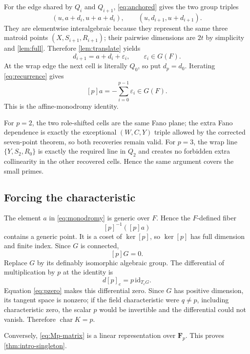 \documentclass[11pt]{article}
\theoremstyle{definition}
\begin{document}
For the edge shared by $Q_i$ and $Q_{i+1}$, \eqref{eq:anchored} gives the two group triples
\[
(u,a+d_i,u+a+d_i),\qquad
(u,d_{i+1},u+d_{i+1}).
\]
They are elementwise interalgebraic because they represent the same three matroid points $(X,S_{i+1},R_{i+1})$; their pairwise dimensions are $2t$ by simplicity and \cref{lem:full}.  Therefore \cref{lem:translate} yields
\begin{equation}\label{eq:recurrence}
d_{i+1}=a+d_i+\varepsilon_i,\qquad \varepsilon_i\in G(F).
\end{equation}
At the wrap edge the next cell is literally $Q_0$, so put $d_p=d_0$.  Iterating \eqref{eq:recurrence} gives
\begin{equation}\label{eq:monodromy}
[p]a=-\sum_{i=0}^{p-1}\varepsilon_i\in G(F).
\end{equation}
This is the affine-monodromy identity.

For $p=2$, the two role-shifted cells are the same Fano plane; the extra Fano dependence is exactly the exceptional $(W,C,Y)$ triple allowed by the corrected seven-point theorem, so both recoveries remain valid.  For $p=3$, the wrap line $\{Y,S_2,R_0\}$ is exactly the required line in $Q_2$ and creates no forbidden extra collinearity in the other recovered cells.  Hence the same argument covers the small primes.

\subsection{Forcing the characteristic}

The element $a$ in \eqref{eq:monodromy} is generic over $F$.  Hence the $F$-defined fiber
\[
[p]^{-1}([p]a)
\]
contains a generic point.  It is a coset of $\ker[p]$, so $\ker[p]$ has full dimension and finite index.  Since $G$ is connected,
\begin{equation}\label{eq:pzero}
[p]G=0.
\end{equation}
Replace $G$ by its definably isomorphic algebraic group.  The differential of multiplication by $p$ at the identity is
\[
d[p]_e=p\,\mathrm{id}_{T_eG}.
\]
Equation \eqref{eq:pzero} makes this differential zero.  Since $G$ has positive dimension, its tangent space is nonzero; if the field characteristic were $q\ne p$, including characteristic zero, the scalar $p$ would be invertible and the differential could not vanish.  Therefore $\operatorname{char}K=p$.

Conversely, \eqref{eq:Mp-matrix} is a linear representation over $\mathbf F_p$.  This proves \cref{thm:intro-singleton}.
\end{document}
